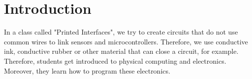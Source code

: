 \documentclass[00_doc.tex]{subfiles}
\begin{document}
    \section{Introduction}
    \begin{flushleft}
        In a class called "Printed Interfaces", we try to create circuits that do not use common wires 
        to link sensors and microcontrollers. Therefore, we use conductive ink, conductive rubber or other
        material that can close a circuit, for example. Therefore, students get introduced to physical 
        computing and electronics. Moreover, they learn how to program these electronics. 
    \end{flushleft}
\end{document}
